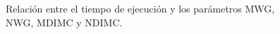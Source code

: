 \begin{figure}[h]
    \begin{center}
    \end{center}
    \caption{\label{figure:reltime}Relación entre el tiempo de ejecución y los parámetros MWG, NWG, MDIMC y NDIMC.}
\end{figure}